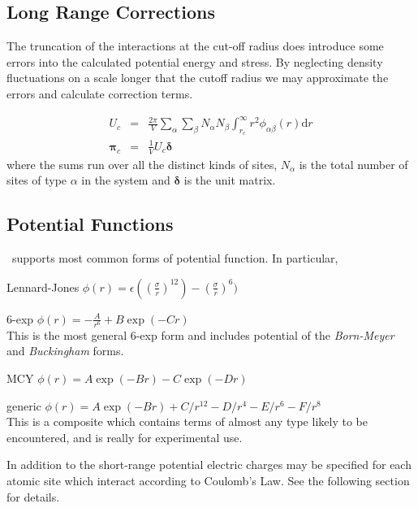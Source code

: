 \subsection{Long Range Corrections}
The truncation of the interactions at the cut-off radius does
introduce some errors into the calculated potential energy and stress.
By neglecting density fluctuations on a scale longer that the cutoff
radius we may approximate the errors and calculate correction 
terms\cite[pp 64-65]{allen:87}.

\begin{eqnarray}
U_c & = & \frac{2\pi}{V} \sum_\alpha \sum_\beta N_\alpha N_\beta 
               \int_{r_c}^\infty r^2 \phi_{\alpha\beta}(r) \mbox{d}r \\
\bm{\pi}_c & = & \frac{1}{V} U_c \bm{\delta}
\end{eqnarray}
where the sums run over all the distinct kinds of sites,
$N_\alpha$ is the total number of sites of type $\alpha$ in the system and
$\bm{\delta}$ is the unit matrix.

\subsection{Potential Functions}
\moldy\ supports most common forms of potential function.  In
particular, 
\begin{list}{}{  \leftmargin=1.5in
\def\makelabel#1{\em #1 \hfil}}
\item[Lennard-Jones] $\phi(r) = \epsilon((\frac{\sigma}{r})^{12}) -
(\frac{\sigma}{r})^{6})$
\item[6-exp] $\phi(r) = -\frac{A}{r^{6}} +
B\exp(-Cr)$\\
This is the most general 6-exp form and
includes potential of the {\em Born-Meyer\/} and {\em Buckingham\/} forms.
\item[MCY] $\phi(r) = A \exp(-Br) - C \exp(-Dr)$
\item[generic]  $\phi(r) = A \exp(-Br) + C/r^{12} - D/r^4 -E/r^6 -F/r^8$\\
This is a composite which contains terms of almost any
type likely to be encountered, and is really for experimental use.
\end{list}

In addition to the short-range potential electric charges may be
specified for each atomic site which interact according to Coulomb's
Law.  See the following section for details.

